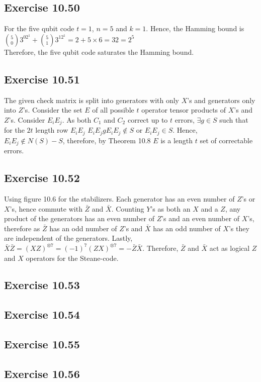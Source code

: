 \documentclass[a4paper,12pt]{article}
\begin{document}
\subsection*{Exercise 10.50}
For the five qubit code $t=1$, $n=5$ and $k=1$. Hence, the Hamming bound is\\
$\displaystyle{5\choose 0}3^02^1+{5\choose 1}3^12^1=2+5\times 6=32=2^5$\\
Therefore, the five qubit code saturates the Hamming bound.
\subsection*{Exercise 10.51}
The given check matrix is split into generators with only $X$'s and generators only into $Z$'s.
Consider the set $E$ of all possible $t$ operator tensor products of $X$'s and $Z$'s. Consider
$E_iE_j$. As both $C_1$ and $C_2$ correct up to $t$ errors, $\exists g\in S$ such that 
for the $2t$ length row $E_iE_j$ $E_iE_jgE_iE_j\notin S$ or $E_iE_j\in S$. Hence,
$E_iE_j\notin N(S)-S$, therefore, by Theorem 10.8 $E$ is a length $t$ set of correctable errors.
\subsection*{Exercise 10.52}
Using figure 10.6 for the stabilizers. Each generator has an even number of $Z$'s or
$X$'s, hence commute with $\bar{Z}$ and $\bar{X}$. 
Counting $Y$'s as both an $X$ and a $Z$, any product of the generators has an even number of $Z$'s
and an even number of $X$'s, therefore as $\bar{Z}$ has an odd number of $Z$'s and
$\bar{X}$ has an odd number of $X$'s they are independent of the generators. Lastly,
$\bar{X}\bar{Z}=(XZ)^{\otimes 7}=(-1)^7(ZX)^{\otimes 7}=-\bar{Z}\bar{X}$. Therefore,
$\bar{Z}$ and $\bar{X}$ act as logical $Z$ and $X$ operators for the Steane-code.
\subsection*{Exercise 10.53}
\subsection*{Exercise 10.54}
\subsection*{Exercise 10.55}
\subsection*{Exercise 10.56}
\end{document}
